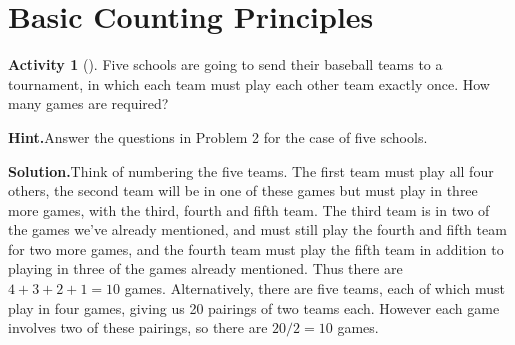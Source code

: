 \documentclass[10pt,]{book}
\theoremstyle{plain}
\theoremstyle{definition}
\newtheorem{activity}[project]{Activity}
\numberwithin{equation}{chapter}
\begin{document}
\section[{Basic Counting Principles}]{Basic Counting Principles}\label{section-2}
\typeout{************************************************}
\typeout{************************************************}
\begin{activity}[]\label{fiveteamtournament}
Five schools are going to send their baseball teams to a tournament, in which each team must play each other team exactly once. How many games are required?%
\par\medskip\noindent%
\textbf{Hint.}\quad Answer the questions in Problem 2 for the case of five schools.\par\medskip\noindent%
\textbf{Solution.}\quad Think of numbering the five teams. The first team must play all four others, the second team will be in one of these games but must play in three more games, with the third, fourth and fifth team. The third team is in two of the games we've already mentioned, and must still play the fourth and fifth team for two more games, and the fourth team must play the fifth team in addition to playing in three of the games already mentioned. Thus there are \(4+3+2+1 = 10\) games. Alternatively, there are five teams, each of which must play in four games, giving us 20 pairings of two teams each. However each game involves two of these pairings, so there are \(20/2 =10\) games.%
\end{activity}
\end{document}
